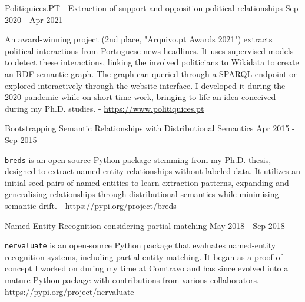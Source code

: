 

\begin{cventries}
  \cvproject
    {} %
	{Politiquices.PT - Extraction of support and opposition political relationships} %
    {} %
    {Sep 2020 - Apr 2021} %
    {
      \begin{cvitems} %
		  \item{An award-winning project (2nd place, "Arquivo.pt Awards 2021") extracts political interactions from Portuguese news headlines. It uses supervised models to detect these interactions, linking the involved politicians to Wikidata to create an RDF semantic graph. The graph can queried through a SPARQL endpoint or explored interactively through the website interface. I developed it during the 2020 pandemic while on short-time work, bringing to life an idea conceived during my Ph.D. studies. - \url{https://www.politiquices.pt}}
      \end{cvitems}
    }
\end{cventries}

\begin{cventries}
 \cvproject
   {} %
   {Bootstrapping Semantic Relationships with Distributional Semantics} %
   {} %
   {Apr 2015 - Sep 2015} %
   {
     \begin{cvitems} %
		\item {\texttt{breds} is an open-source Python package stemming from my Ph.D. thesis, designed to extract named-entity relationships without labeled data. It utilizes an initial seed pairs of named-entities to learn extraction patterns, expanding and generalising relationships through distributional semantics while minimising semantic drift. - \url{https://pypi.org/project/breds}}
     \end{cvitems}
   }
\end{cventries}

\begin{cventries}
 \cvproject
   {} %
   {Named-Entity Recognition considering partial matching} %
   {} %
   {May 2018 - Sep 2018} %
   {
     \begin{cvitems} %
     	\item {\texttt{nervaluate} is an open-source Python package that evaluates named-entity recognition systems, including partial entity matching. It began as a proof-of-concept I worked on during my time at Comtravo and has since evolved into a mature Python package with contributions from various collaborators. - \url{https://pypi.org/project/nervaluate}}
     \end{cvitems}
   }
\end{cventries}
